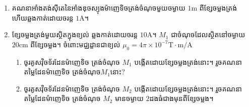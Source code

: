 \begin{example}
	\begin{enumerate}[m]
		\item គណនាអាំងតង់ស៊ីតេនៃអាំងឌុចស្យុងម៉ាញេទិចត្រង់ចំណុចមួយចម្ងាយ $1\si{\metre}$ ពីខ្សែចម្លងត្រង់ ហើយឆ្លងកាត់ដោយចរន្ត $1\si{\ampere}$។
		\item ខ្សែចម្លងត្រង់មួយស្ថិតក្នុងខ្យល់ ឆ្លងកាត់ដោយចរន្ត $10\si{\ampere}$។ $M_{1}$ ជាចំណុចដែលស្ថិតនៅចម្ងាយ $20\si{\centi\metre}$ ពីខ្សែចម្លង។ ចំពោះមជ្ឈដ្ខានជាខ្យល់ $\mu_{0}=4\pi\times10^{-7}\si{\tesla\cdot\metre/\ampere}$
		\begin{enumerate}
			\item ចូរគូសវ៉ិចទ័រដែនម៉ាញេទិច ត្រង់ចំណុច $M_{1}$ បង្កើតដោយខ្សែចម្លងត្រង់នោះ។ រួចគណនាតម្លៃដែនម៉ាញេទិច ត្រង់ចំណុច​ $M_{1}$នោះ?
			\item ចូរគូសវ៉ិចទ័រដែនម៉ាញេទិច ត្រង់ចំណុច $M_{2}$ បង្កើតដោយខ្សែចម្លងត្រង់នោះ។
			រួចគណនាតម្លៃដែនម៉ាញេទិច ត្រង់ចំណុច $M_{2}$ មានចម្ងាយ $2$ដងធំជាងមុនពីខ្សែចម្លង។
		\end{enumerate}
	\end{enumerate}
\end{example}
